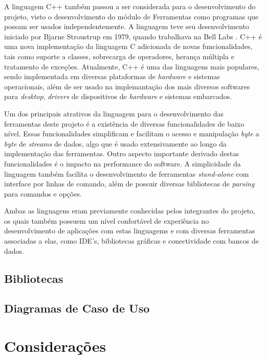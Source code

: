 A linguagem C++ também passou a ser considerada para o desenvolvimento do projeto, visto o desenvolvimento do módulo de Ferramentas como programas que possam ser usados independentemente. 
A linguagem teve seu desenvolvimento iniciado por Bjarne Stroustrup em 1979, quando trabalhava na Bell Labs \cite{wikicplusplus}.
C++ é uma nova implementação da linguagem C adicionada de novas funcionalidades, tais como suporte a classes, sobrecarga de operadores, herança múltipla e tratamento de exceções.
Atualmente, C++ é uma das linguagens mais populares, sendo implementada em diversas plataformas de \emph{hardware} e sistemas operacionais, além de ser usado na implemantação dos mais diversos softwares para \emph{desktop}, \emph{drivers} de dispositivos de \emph{hardware} e sistemas embarcados.

Um dos principais atrativos da linguagem para o desenvolvimento das ferramentas deste projeto é a existência de diversas funcionalidades de baixo nível. 
Essas funcionalidades simplificam e facilitam o acesso e manipulação \emph{byte} a \emph{byte} de \emph{streams} de dados, algo que é usado extensivamente ao longo da implementação das ferramentas.
Outro aspecto importante derivado destas funcionalidades é o impacto na performance do software. %
A simplicidade da linguagem também facilita o desenvolvimento de ferramentas \emph{stand-alone} com interface por linhas de comando, além de possuir diversas bibliotecas de \emph{parsing} para comandos e opções.

Ambas as linguagens eram previamente conhecidas pelos integrantes do projeto, os quais também possuem um nível confortável de experiência no desenvolvimento de aplicações com estas linguagems e com diversas ferramentas associadas a elas, como IDE's, bibliotecas gráficas e conectividade com bancos de dados.

\subsection{Bibliotecas}
\subsection{Diagramas de Caso de Uso}
\section{Considerações}
